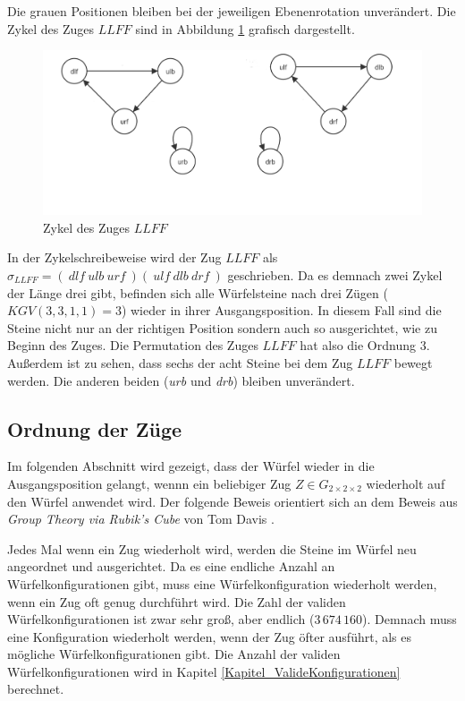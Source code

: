 \documentclass[12pt,a4paper, usenames, dvipsnames]{article}
\theoremstyle{mystyle}
\theoremstyle{definition}
\newcommand{\Gtwo}{\ensuremath{G_{2\times 2\times 2}}}
\begin{document}
Die grauen Positionen bleiben bei der jeweiligen Ebenenrotation unverändert. 
Die Zykel des Zuges $LLFF$ sind in Abbildung \ref{Abbildung_ZykelVonLLFF} grafisch dargestellt. 
\begin{figure}[H]
\centering
\includegraphics[scale=0.25]{zykel_LLFF.png}
\caption[Zykel des Zuges $LLFF$]{Zykel des Zuges $LLFF$}
\label{Abbildung_ZykelVonLLFF}
\end{figure}
In der Zykelschreibeweise wird der Zug $LLFF$ als $\sigma_{LLFF}=( \ \textit{dlf} \ \textit{ulb} \ \textit{urf}\ )(\ \textit{ulf} \ \textit{dlb} \ \textit{drf} \ )$ geschrieben.
Da es demnach zwei Zykel der Länge drei gibt, befinden sich alle Würfelsteine nach drei Zügen ($KGV(3,3,1,1)=3$) wieder in ihrer Ausgangsposition. 
In diesem Fall sind die Steine nicht nur an der richtigen Position sondern auch so ausgerichtet, wie zu Beginn des Zuges. Die Permutation des Zuges $LLFF$ hat also die Ordnung $3$.
Außerdem ist zu sehen, dass sechs der acht Steine bei dem Zug $LLFF$ bewegt werden. Die anderen beiden (\textit{urb} und \textit{drb}) bleiben unverändert. 
%
%
%
%
%
%
%
%
%
%
%
%

\subsection{Ordnung der Züge}
\label{Abschnitt_OrdnungZüge}

Im folgenden Abschnitt wird gezeigt, dass der Würfel wieder in die Ausgangsposition gelangt, wennn ein beliebiger Zug $Z \in \Gtwo$ wiederholt auf den Würfel anwendet wird.
Der folgende Beweis orientiert sich an dem Beweis aus \textit{Group Theory via Rubik's Cube} von Tom Davis \cite{TD}.

Jedes Mal wenn ein Zug wiederholt wird, werden die Steine im Würfel neu angeordnet und ausgerichtet. 
Da es eine endliche Anzahl an Würfelkonfigurationen gibt, muss eine Würfelkonfiguration wiederholt werden, wenn ein Zug oft genug durchführt wird.
Die Zahl der validen Würfelkonfigurationen ist zwar sehr groß, aber endlich ($3 \, 674 \, 160$). Demnach muss eine Konfiguration wiederholt werden, wenn der Zug öfter ausführt, als es mögliche Würfelkonfigurationen gibt. Die Anzahl der validen Würfelkonfigurationen wird in Kapitel \ref{Kapitel_ValideKonfigurationen} berechnet.
\end{document}
